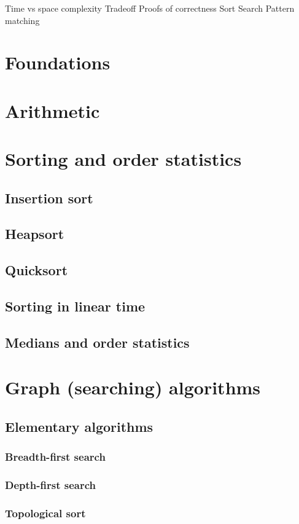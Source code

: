 Time vs space complexity
Tradeoff
Proofs of correctness
Sort
Search
Pattern matching

\section{Foundations}
\section{Arithmetic}
\section{Sorting and order statistics}
\subsection{Insertion sort}
\subsection{Heapsort}
\subsection{Quicksort}
\subsection{Sorting in linear time}
\subsection{Medians and order statistics}
\section{Graph (searching) algorithms}
\subsection{Elementary algorithms}
\subsubsection{Breadth-first search}
\subsubsection{Depth-first search}
\subsubsection{Topological sort}
